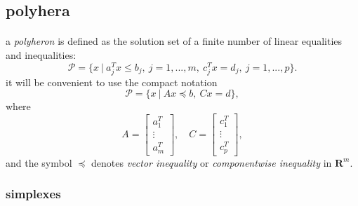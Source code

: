 \documentclass{article}
\begin{document}
  \subsection{polyhera}
    \paragraph{} a \textit{polyheron} is defined as the solution set of a finite number of linear equalities and inequalities:
    \begin{equation}
      \mathcal{P} = \{x\ |\ a_j^Tx \leq b_j,\ j = 1,...,m,\ c_j^Tx = d_j,\ j = 1,...,p\}.
    \end{equation}
    it will be convenient to use the compact notation
    \begin{equation}
      \mathcal{P} = \{x\ |\ Ax\preceq b,\ Cx = d\},
    \end{equation}
    where
    \begin{equation}
      A =
      \begin{bmatrix}
        a_1^T \\
        \vdots \\
        a_m^T
      \end{bmatrix}
      ,\quad
      C =
      \begin{bmatrix}
        c_1^T \\
        \vdots \\
        c_p^T
      \end{bmatrix}
      ,
    \end{equation}
    and the symbol $\preceq$ denotes \textit{vector inequality} or \textit{componentwise inequality} in $\mathbf{R}^m$.
    \subsubsection{simplexes}
\end{document}
